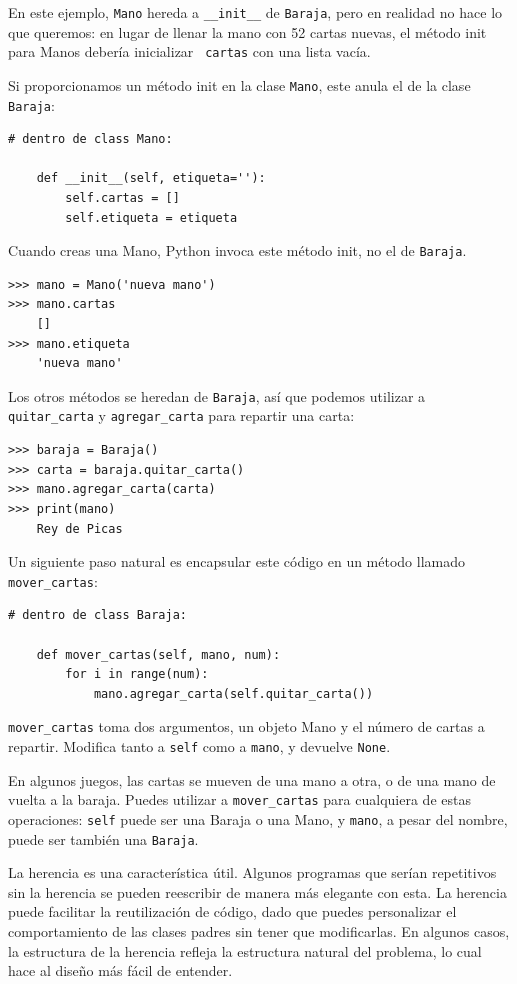 \documentclass[10pt]{book}
\begin{document}
En este ejemplo, {\tt Mano} hereda a \verb"__init__" de {\tt Baraja},
pero en realidad no hace lo que queremos: en lugar de llenar la mano
con 52 cartas nuevas, el método init para Manos debería inicializar {\tt
  cartas} con una lista vacía.   

Si proporcionamos un método init en la clase {\tt Mano}, este anula el
de la clase {\tt Baraja}:

\begin{verbatim}
# dentro de class Mano:

    def __init__(self, etiqueta=''):
        self.cartas = []
        self.etiqueta = etiqueta
\end{verbatim}
%
Cuando creas una Mano, Python invoca este método init, no el
de {\tt Baraja}.

\begin{verbatim}
>>> mano = Mano('nueva mano')
>>> mano.cartas
    []
>>> mano.etiqueta
    'nueva mano'
\end{verbatim}
%
Los otros métodos se heredan de {\tt Baraja}, así que podemos utilizar a
\verb"quitar_carta" y \verb"agregar_carta" para repartir una carta:

\begin{verbatim}
>>> baraja = Baraja()
>>> carta = baraja.quitar_carta()
>>> mano.agregar_carta(carta)
>>> print(mano)
    Rey de Picas
\end{verbatim}
%
Un siguiente paso natural es encapsular este código en un método
llamado \verb"mover_cartas":


\begin{verbatim}
# dentro de class Baraja:

    def mover_cartas(self, mano, num):
        for i in range(num):
            mano.agregar_carta(self.quitar_carta())
\end{verbatim}
%
\verb"mover_cartas" toma dos argumentos, un objeto Mano y el número de
cartas a repartir.  Modifica tanto a {\tt self} como a {\tt mano}, y
devuelve {\tt None}.

En algunos juegos, las cartas se mueven de una mano a otra,
o de una mano de vuelta a la baraja.  Puedes utilizar a \verb"mover_cartas"
para cualquiera de estas operaciones: {\tt self} puede ser una Baraja
o una Mano, y {\tt mano}, a pesar del nombre, puede ser también una {\tt Baraja}.

La herencia es una característica útil.  Algunos programas que serían
repetitivos sin la herencia se pueden reescribir de manera más elegante
con esta.  La herencia puede facilitar la reutilización de código, dado que puedes
personalizar el comportamiento de las clases padres sin tener que
modificarlas.  En algunos casos, la estructura de la herencia refleja la estructura
natural del problema, lo cual hace al diseño más fácil
de entender.
\end{document}
